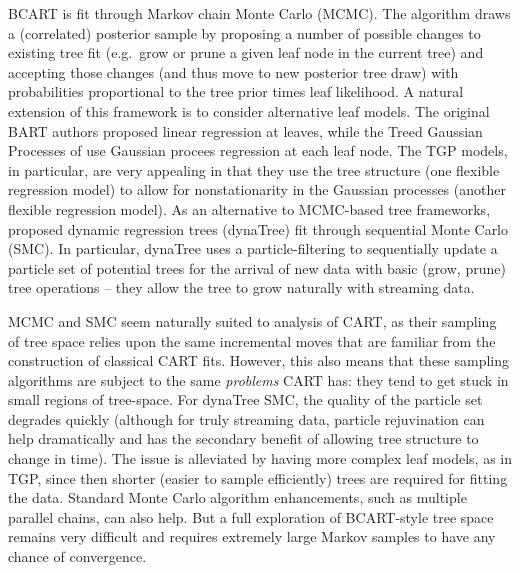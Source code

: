\documentclass[12pt]{article}
\begin{document}
BCART is fit through Markov chain Monte Carlo (MCMC). The algorithm
draws a (correlated) posterior sample by proposing a number of possible
changes to existing tree fit (e.g.~grow or prune a given leaf node in
the current tree) and accepting those changes (and thus move to new
posterior tree draw) with probabilities proportional to the tree prior
times leaf likelihood. A natural extension of this framework is to
consider alternative leaf models. The original BART authors proposed
linear regression at leaves, while the Treed Gaussian Processes of
\cite{gramacy_bayesian_2008} use Gaussian procees regression at each
leaf node. The TGP models, in particular, are very appealing in that
they use the tree structure (one flexible regression model) to allow for
nonstationarity in the Gaussian processes (another flexible regression
model). As an alternative to MCMC-based tree frameworks,
\cite{taddy_dynamic_2011} proposed dynamic regression trees (dynaTree)
fit through sequential Monte Carlo (SMC). In particular, dynaTree uses a
particle-filtering to sequentially update a particle set of potential
trees for the arrival of new data with basic (grow, prune) tree
operations -- they allow the tree to grow naturally with streaming data.

MCMC and SMC seem naturally suited to analysis of CART, as their
sampling of tree space relies upon the same incremental moves that are
familiar from the construction of classical CART fits. However, this
also means that these sampling algorithms are subject to the same
\emph{problems} CART has: they tend to get stuck in small regions of
tree-space. For dynaTree SMC, the quality of the particle set degrades
quickly (although for truly streaming data, particle rejuvination can
help dramatically and has the secondary benefit of allowing tree
structure to change in time). The issue is alleviated by having more
complex leaf models, as in TGP, since then shorter (easier to sample
efficiently) trees are required for fitting the data. Standard Monte
Carlo algorithm enhancements, such as multiple parallel chains, can also
help. But a full exploration of BCART-style tree space remains very
difficult and requires extremely large Markov samples to have any chance
of convergence.
\end{document}
